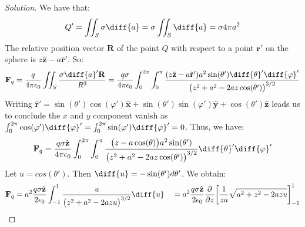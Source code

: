 \documentclass[crop=false,class=article,oneside]{standalone}
\begin{document}
        \begin{proof}[Solution]
            We have that:
            \begin{equation*}
                Q'=\iint_{S}\sigma\diff{a}
                =\sigma\iint_{S}\diff{a}
                =\sigma{4}\pi{a^{2}}
            \end{equation*}
            The relative position vector $\mathbf{R}$ of the point
            $Q$ with respect to a point $\mathbf{r}'$ on the sphere
            is $z\hat{\mathbf{z}}-a\hat{\mathbf{r}}'$. So:
            \begin{equation*}
                \mathbf{F}_{q}
                =\frac{q}{4\pi\epsilon_{0}}\iint_{S}
                \frac{\sigma\diff{a}'\mathbf{R}}{R^{3}}
                =\frac{q\sigma}{4\pi\epsilon_{0}}
                \int_{0}^{2\pi}\int_{0}^{\pi}
                \frac{(z\hat{\mathbf{z}}-a\hat{\mathbf{r}}')a^{2}
                      \sin(\theta')\diff{\theta}'\diff{\varphi}'}
                     {\big(z^2+a^2-2az\cos(\theta')\big)^{3/2}}
            \end{equation*}
            Writing
            $\hat{\mathbf{r}}'%
             =\sin(\theta')\cos(\varphi')\hat{\mathbf{x}}%
             +\sin(\theta')\sin(\varphi')\hat{\mathbf{y}}%
             +\cos(\theta')\hat{\mathbf{z}}$
            leads us to conclude the $x$ and $y$ component vanish as
            $\int_{0}^{2\pi}\cos(\varphi')\diff{\varphi}'%
             =\int_{0}^{2\pi}\sin(\varphi')\diff{\varphi}'%
             =0$.
            Thus, we have:
            \begin{equation*}
                \mathbf{F}_{q}
                =\frac{q\sigma\hat{\mathbf{z}}}{4\pi\epsilon_{0}}
                \int_{0}^{2\pi}\int_{0}^{\pi}
                \frac{\big(z-a\cos(\theta)\big)a^{2}
                      \sin(\theta')}
                     {\big(z^{2}+a^{2}-2az\cos(\theta')\big)^{3/2}}
                \diff{\theta}'\diff{\varphi}'
            \end{equation*}
            Let $u=cos(\theta')$.
            Then $\diff{u}=-\sin(\theta')d\theta'$. We obtain:
            \begin{align*}
                \mathbf{F}_{q}
                &=a^{2}\frac{q\sigma \hat{\mathbf{z}}}{2\epsilon_{0}}
                \int_{-1}^{1}\frac{u}{\big(z^{2}+a^{2}-2azu\big)^{3/2}}\diff{u}
                &
                &=a^{2}\frac{q\sigma \hat{\mathbf{z}}}{2\epsilon_{0}}
                \frac{\partial}{\partial z}
                \bigg[\frac{1}{za}\sqrt{a^{2}+z^{2}-2azu}\bigg]_{-1}^{1}\\

\end{align*}
\end{proof}
\end{document}

